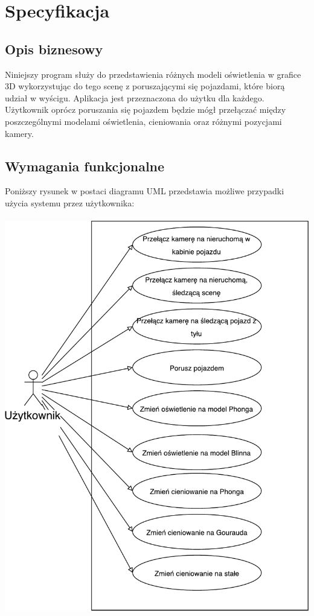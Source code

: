 \documentclass[11pt]{article}
\let\Oldsection\section
\renewcommand{\section}{\FloatBarrier\Oldsection}
\let\Oldsubsection\subsection
\renewcommand{\subsection}{\FloatBarrier\Oldsubsection}
\begin{document}
\newpage


\section{Specyfikacja}
\subsection{Opis biznesowy}

\par Niniejszy program służy do przedstawienia różnych modeli oświetlenia w grafice 3D wykorzystując do tego scenę z poruszającymi się pojazdami, które biorą udział w wyścigu. Aplikacja jest przeznaczona do użytku dla każdego. Użytkownik oprócz poruszania się pojazdem będzie mógł przełączać między poszczególnymi modelami oświetlenia, cieniowania oraz różnymi pozycjami kamery.
\subsection{Wymagania funkcjonalne}
Poniższy rysunek w postaci diagramu UML przedstawia możliwe przypadki użycia systemu przez użytkownika:
\\
\\
\includegraphics[scale=0.5]{use_case_pdf}
\end{document}
